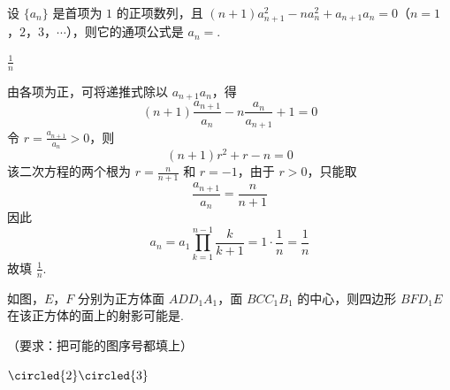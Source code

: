 \begin{problem}
设 \(\{a_{n}\}\) 是首项为 \(1\) 的正项数列，且 \((n + 1)a_{n + 1}^{2} - na_{n}^{2} + a_{n + 1}a_{n} = 0\)（\(n = 1\)，\(2\)，\(3\)，\(\cdots\)），则它的通项公式是 \(a_{n}=\)\fillinblank{}.
\end{problem}

\begin{answer}
\(\frac{1}{n}\)
\end{answer}

\begin{solution}
由各项为正，可将递推式除以 \(a_{n+1}a_n\)，得
\[
(n+1)\frac{a_{n+1}}{a_n}-n\frac{a_n}{a_{n+1}}+1=0
\]
令 \(r=\frac{a_{n+1}}{a_n}>0\)，则
\[
(n+1)r^{2}+r-n=0
\]
该二次方程的两个根为 \(r=\frac{n}{n+1}\) 和 \(r=-1\)，由于 \(r>0\)，只能取
\[
\frac{a_{n+1}}{a_n}=\frac{n}{n+1}
\]
因此
\[
a_n=a_1\prod_{k=1}^{n-1}\frac{k}{k+1}=1\cdot\frac{1}{n}=\frac{1}{n}
\]
故填 \(\frac{1}{n}\).
\end{solution}

\begin{problem}
如图，\(E\)，\(F\) 分别为正方体面 \(ADD_{1}A_{1}\)，面 \(BCC_{1}B_{1}\) 的中心，则四边形 \(BFD_{1}E\) 在该正方体的面上的射影可能是\fillinblank{}.

（要求：把可能的图序号都填上）

\begingroup
\leftskip=0pt\relax
\rightskip=0pt\relax
{}
\endgroup
\end{problem}

\begin{answer}
\(\circled{2}\circled{3}\)
\end{answer}

